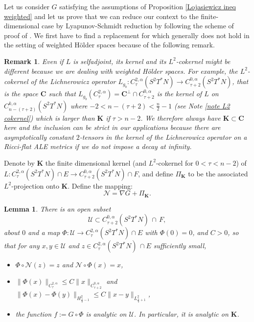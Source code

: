 \documentclass[a4paper,11pt,reqno]{amsart}
\newtheorem{lemma}[defn]{Lemma}
\newtheorem{rk}[defn]{Remark}
\numberwithin{equation}{section}
\begin{document}
	Let us consider $G$ satisfying the assumptions of Proposition \ref{Lojasiewicz ineq weighted} and let us prove that we can reduce our context to the finite-dimensional case by Lyapunov-Schmidt reduction by following the scheme of proof of \cite[Section 7]{Col-Min-Ein-Tan-Con}. We first have to find a replacement for \cite[Lemma 7.5]{Col-Min-Ein-Tan-Con} which generally does not hold in the setting of weighted Hölder spaces because of the following remark.
	\begin{rk}\label{cokernel weighted spaces}
		Even if $L$ is selfadjoint, its kernel and its $L^2$-cokernel might be different because we are dealing with weighted H\"older spaces. For example, the $L^2$-cokernel of the Lichnerowicz operator $L_{g_b} : C^{2,\alpha}_{\tau}(S^2T^*N)\to C^{0,\alpha}_{\tau+2}(S^2T^*N)$, that is the space $\mathbf{C}$ such that $L_{g_b}(C^{2,\alpha}_{\tau}) = \mathbf{C}^\perp \cap C^{0,\alpha}_{\tau+2}$ is the kernel of $L$ on $C^{k,\alpha}_{n-(\tau+2)}(S^2T^*N)$ where $-2<n-(\tau+2)<\frac{n}{2}-1$ (see Note \ref{note L2 cokernel}) which is larger than $\mathbf{K}$ if $\tau>n-2$. We therefore always have $\mathbf{K}\subset\mathbf{C}$ here and the inclusion can be strict in our applications because there are asymptotically constant $2$-tensors in the kernel of the Lichnerowicz operator on a Ricci-flat ALE metrics if we do not impose a decay at infinity.
	\end{rk}
	Denote by $\mathbf{K}$ the finite dimensional kernel (and $L^2$-cokernel for $0<\tau<n-2$) of $L : C^{2,\alpha}_{\tau}(S^2T^*N)\cap E\to C^{0,\alpha}_{\tau+2}(S^2T^*N)\cap F$, and define $\Pi_\mathbf{K}$ to be the associated $L^2$-projection onto $\mathbf{K}$. Define the mapping:
	\begin{equation*}
	\mathcal{N} =\nabla G + \Pi_\mathbf{K}.
	\end{equation*}
	\begin{lemma}\label{reduction LS}
		There is an open subset $$\mathcal{U}\subset  C^{0,\alpha}_{\tau+2}(S^2T^*N)\,\cap\,F,$$ about $0$ and a map $\Phi : \mathcal{U}\to C^{2,\alpha}_{\tau}(S^2T^*N)\cap E$ with $\Phi(0) = 0$, and $C>0$, so that for any $x,y\in \mathcal{U}$ and $z\in C^{2,\alpha}_{\tau}(S^2T^*N)\,\cap E$ sufficiently small,
		\begin{itemize}
			\item $\Phi\circ \mathcal{N}(z) = z$ and $\mathcal{N}\circ\Phi(x) = x$,
			\item $ \|\Phi(x)\|_{C^{2,\alpha}_{\tau}}\leq C \|x\|_{C^{0,\alpha}_{\tau+2}} $ and $ \|\Phi(x)-\Phi(y)\|_{H^2_{\frac{n}{2}-1}}\leq C \|x-y\|_{L^2_{\frac{n}{2}+1}} $,
			\item the function $ f := G\circ \Phi$ is analytic on $\mathcal{U}$. In particular, it is analytic on $\mathbf{K}$.
		\end{itemize}
	\end{lemma}
\end{document}
